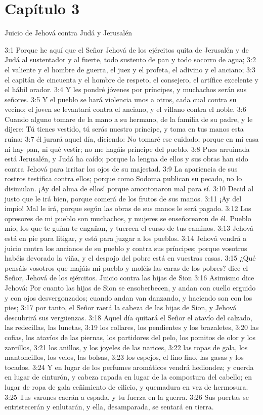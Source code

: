 \section*{Capítulo 3}
Juicio de Jehová contra Judá y Jerusalén 
 
3:1 Porque he aquí que el Señor Jehová de los ejércitos quita de Jerusalén y de Judá al sustentador y al fuerte, todo sustento de pan y todo socorro de agua; 
3:2 el valiente y el hombre de guerra, el juez y el profeta, el adivino y el anciano; 
3:3 el capitán de cincuenta y el hombre de respeto, el consejero, el artífice excelente y el hábil orador. 
3:4 Y les pondré jóvenes por príncipes, y muchachos serán sus señores. 
3:5 Y el pueblo se hará violencia unos a otros, cada cual contra su vecino; el joven se levantará contra el anciano, y el villano contra el noble. 
3:6 Cuando alguno tomare de la mano a su hermano, de la familia de su padre, y le dijere: Tú tienes vestido, tú serás nuestro príncipe, y toma en tus manos esta ruina; 
3:7 él jurará aquel día, diciendo: No tomaré ese cuidado; porque en mi casa ni hay pan, ni qué vestir; no me hagáis príncipe del pueblo. 
3:8 Pues arruinada está Jerusalén, y Judá ha caído; porque la lengua de ellos y sus obras han sido contra Jehová para irritar los ojos de su majestad. 
3:9 La apariencia de sus rostros testifica contra ellos; porque como Sodoma publican su pecado, no lo disimulan. ¡Ay del alma de ellos! porque amontonaron mal para sí. 
3:10 Decid al justo que le irá bien, porque comerá de los frutos de sus manos. 
3:11 ¡Ay del impío! Mal le irá, porque según las obras de sus manos le será pagado. 
3:12 Los opresores de mi pueblo son muchachos, y mujeres se enseñorearon de él. Pueblo mío, los que te guían te engañan, y tuercen el curso de tus caminos. 
3:13 Jehová está en pie para litigar, y está para juzgar a los pueblos. 
3:14 Jehová vendrá a juicio contra los ancianos de su pueblo y contra sus príncipes; porque vosotros habéis devorado la viña, y el despojo del pobre está en vuestras casas. 
3:15 ¿Qué pensáis vosotros que majáis mi pueblo y moléis las caras de los pobres? dice el Señor, Jehová de los ejércitos. 
Juicio contra las hijas de Sion 
3:16 Asimismo dice Jehová: Por cuanto las hijas de Sion se ensoberbecen, y andan con cuello erguido y con ojos desvergonzados; cuando andan van danzando, y haciendo son con los pies; 
3:17 por tanto, el Señor raerá la cabeza de las hijas de Sion, y Jehová descubrirá sus vergüenzas. 
3:18 Aquel día quitará el Señor el atavío del calzado, las redecillas, las lunetas, 
3:19 los collares, los pendientes y los brazaletes, 
3:20 las cofias, los atavíos de las piernas, los partidores del pelo, los pomitos de olor y los zarcillos, 
3:21 los anillos, y los joyeles de las narices, 
3:22 las ropas de gala, los mantoncillos, los velos, las bolsas, 
3:23 los espejos, el lino fino, las gasas y los tocados. 
3:24 Y en lugar de los perfumes aromáticos vendrá hediondez; y cuerda en lugar de cinturón, y cabeza rapada en lugar de la compostura del cabello; en lugar de ropa de gala ceñimiento de cilicio, y quemadura en vez de hermosura. 
3:25 Tus varones caerán a espada, y tu fuerza en la guerra. 
3:26 Sus puertas se entristecerán y enlutarán, y ella, desamparada, se sentará en tierra. 

